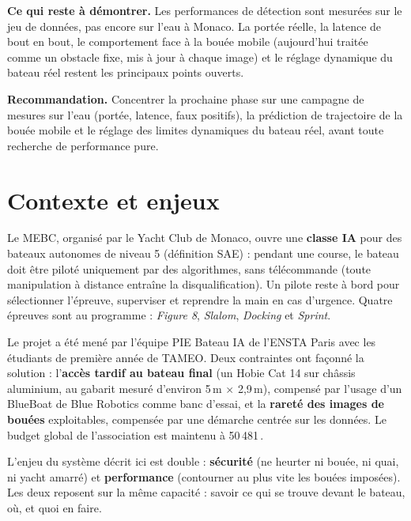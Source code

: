 \documentclass[11pt,letterpaper]{article}
\begin{document}
\noindent\textbf{Ce qui reste à démontrer.} Les performances de détection sont
mesurées sur le jeu de données, pas encore sur l'eau à Monaco. La portée réelle,
la latence de bout en bout, le comportement face à la bouée mobile (aujourd'hui
traitée comme un obstacle fixe, mis à jour à chaque image) et le réglage
dynamique du bateau réel restent les principaux points ouverts.

\noindent\textbf{Recommandation.} Concentrer la prochaine phase sur une
campagne de mesures sur l'eau (portée, latence, faux positifs), la prédiction
de trajectoire de la bouée mobile et le réglage des limites dynamiques du
bateau réel, avant toute recherche de performance pure.

\section{Contexte et enjeux}

Le MEBC, organisé par le Yacht Club de Monaco, ouvre une \textbf{classe IA}
pour des bateaux autonomes de niveau 5 (définition SAE) : pendant une course,
le bateau doit être piloté uniquement par des algorithmes, sans télécommande
(toute manipulation à distance entraîne la disqualification). Un pilote reste
à bord pour sélectionner l'épreuve, superviser et reprendre la main en cas
d'urgence. Quatre épreuves sont au programme : \emph{Figure 8},
\emph{Slalom}, \emph{Docking} et \emph{Sprint}.

Le projet a été mené par l'équipe PIE \og Bateau IA \fg{} de l'ENSTA Paris
avec les étudiants de première année de TAMEO. Deux contraintes ont façonné
la solution : l'\textbf{accès tardif au bateau final} (un Hobie Cat 14 sur
châssis aluminium, au gabarit mesuré d'environ 5\,m $\times$ 2,9\,m), compensé par l'usage d'un
BlueBoat de Blue Robotics comme banc d'essai, et la \textbf{rareté des images
de bouées} exploitables, compensée par une démarche centrée sur les données.
Le budget global de l'association est maintenu à 50\,481\,\texteuro{}.

L'enjeu du système décrit ici est double : \textbf{sécurité} (ne heurter ni
bouée, ni quai, ni yacht amarré) et \textbf{performance} (contourner au plus
vite les bouées imposées). Les deux reposent sur la même capacité : savoir ce
qui se trouve devant le bateau, où, et quoi en faire.

\end{document}
